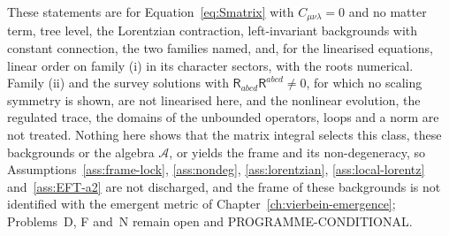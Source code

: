 These statements are for Equation~\eqref{eq:Smatrix} with \(C_{\mu\nu\lambda}=0\) and no matter term, tree level, the Lorentzian contraction, left-invariant backgrounds with constant connection, the two families named, and, for the linearised equations, linear order on family (i) in its character sectors, with the roots numerical. Family (ii) and the survey solutions with \(\mathsf R_{abcd}\mathsf R^{abcd}\neq0\), for which no scaling symmetry is shown, are not linearised here, and the nonlinear evolution, the regulated trace, the domains of the unbounded operators, loops and a norm are not treated. Nothing here shows that the matrix integral selects this class, these backgrounds or the algebra \(\mathcal A\), or yields the frame and its non-degeneracy, so Assumptions~\ref{ass:frame-lock}, \ref{ass:nondeg}, \ref{ass:lorentzian}, \ref{ass:local-lorentz} and~\ref{ass:EFT-a2} are not discharged, and the frame of these backgrounds is not identified with the emergent metric of Chapter~\ref{ch:vierbein-emergence}; Problems~D, F and~N remain open and PROGRAMME-CONDITIONAL.
